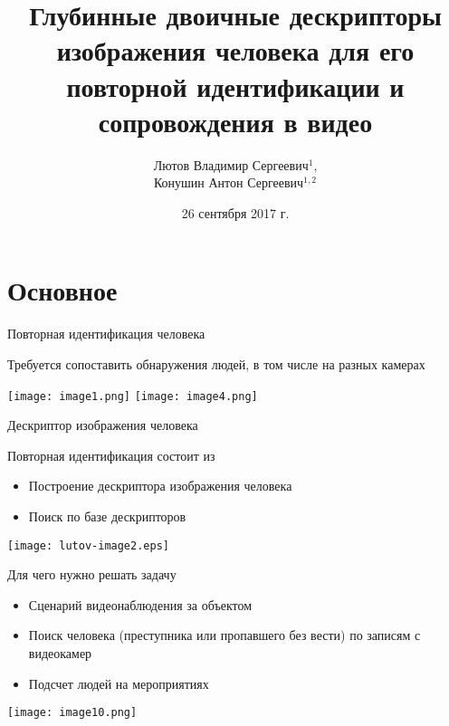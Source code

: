 \documentclass[14pt,mathserif,aspectratio=43]{beamer}
\title{\normalsize{Глубинные двоичные дескрипторы изображения человека для его повторной идентификации и сопровождения в видео}}
\author{\small{Лютов Владимир Сергеевич$^1$, \\Конушин Антон Сергеевич$^{1,2}$}}
\institute{
    \small{$^1$МГУ, $^2$ВШЭ}

    \smallskip

    \texttt{[image: lab\_logo.eps]}
}
\date{\small{26 сентября 2017 г.}}
\begin{document}
\begin{frame}[plain]
    \titlepage
\end{frame}

\section{Основное}

\begin{frame}{Повторная идентификация человека}

    Требуется сопоставить обнаружения людей, в том числе на разных камерах

    \bigskip

    \texttt{[image: image1.png]}
    \texttt{[image: image4.png]}
\end{frame}

\begin{frame}{Дескриптор изображения человека}

    \textcolor{lab-blue}{Повторная идентификация состоит из}
    
    \begin{itemize}
        \item Построение дескриптора изображения человека
        \item Поиск по базе дескрипторов
    \end{itemize}
    
    \bigskip
    
    \begin{center}
        \texttt{[image: lutov-image2.eps]}
    \end{center}
\end{frame}

\begin{frame}[label=reason]{Для чего нужно решать задачу}

    \begin{itemize}
        \item Сценарий видеонаблюдения за объектом
        \item Поиск человека (преступника или пропавшего без вести) по записям с видеокамер
        \item Подсчет людей на мероприятиях
    \end{itemize}
    
    \begin{center}
        \texttt{[image: image10.png]}
    \end{center}
    
    \hyperlink{hard_things}{}

\end{frame}
\end{document}
